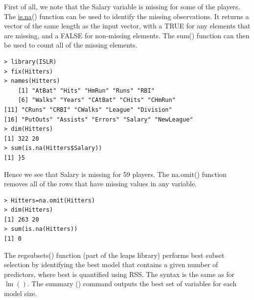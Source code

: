 \documentclass[10pt]{article}
\begin{document}
First of all, we note that the Salary variable is missing for some of the players. The \href{http://is.na}{is.na}() function can be used to identify the missing observations. It returns a vector of the same length as the input vector, with a TRUE for any elements that are missing, and a FALSE for non-missing elements. The sum() function can then be used to count all of the missing elements.

\begin{verbatim}
> library(ISLR)
> fix(Hitters)
> names(Hitters)
    [1] "AtBat" "Hits" "HmRun" "Runs" "RBI"
    [6] "Walks" "Years" "CAtBat" "CHits" "CHmRun"
[11] "CRuns" "CRBI" "CWalks" "League" "Division"
[16] "PutOuts" "Assists" "Errors" "Salary" "NewLeague"
> dim(Hitters)
[1] 322 20
> sum(is.na(Hitters$Salary))
[1] }5
\end{verbatim}

Hence we see that Salary is missing for 59 players. The na.omit() function removes all of the rows that have missing values in any variable.

\begin{verbatim}
> Hitters=na.omit(Hitters)
> dim(Hitters)
[1] 263 20
> sum(is.na(Hitters))
[1] 0
\end{verbatim}

The regsubsets() function (part of the leaps library) performs best subset selection by identifying the best model that contains a given number of predictors, where best is quantified using RSS. The syntax is the same as for $\operatorname{lm}()$. The summary () command outputs the best set of variables for each model size.
\end{document}
